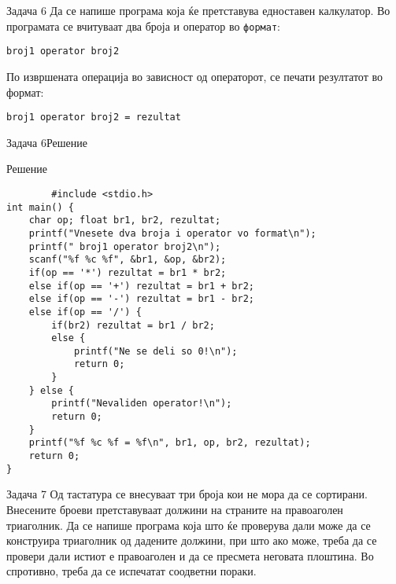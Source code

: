 \begin{frame}[fragile]{Задача 6}
Да се напише програма која ќе претставува едноставен калкулатор. Во програмата
се вчитуваат два броја и оператор во \texttt{формат}:
\begin{center}
\texttt{broj1 operator broj2}
\end{center}
По извршената операција во зависност од операторот, се печати резултатот во формат:
\begin{center}
\texttt{broj1 operator broj2 = rezultat}
\end{center}
\end{frame}

\begin{frame}[fragile]{Задача 6}{Решение}
	\begin{exampleblock}{Решение}
		\begin{lstlisting}
		#include <stdio.h>
int main() {
    char op; float br1, br2, rezultat;
    printf("Vnesete dva broja i operator vo format\n");
    printf(" broj1 operator broj2\n");
    scanf("%f %c %f", &br1, &op, &br2);
    if(op == '*') rezultat = br1 * br2;
    else if(op == '+') rezultat = br1 + br2;
    else if(op == '-') rezultat = br1 - br2;
    else if(op == '/') {
        if(br2) rezultat = br1 / br2;
        else {
            printf("Ne se deli so 0!\n");
            return 0;
        }
    } else {
        printf("Nevaliden operator!\n");
        return 0;
    }
    printf("%f %c %f = %f\n", br1, op, br2, rezultat);
    return 0;
}
		\end{lstlisting}
	\end{exampleblock}
\end{frame}


\begin{frame}[fragile]{Задача 7}
Од тастатура се внесуваат три броја кои не мора да се сортирани. Внесените броеви претставуваат должини на страните на правоаголен триаголник. Да се напише програма која што ќе проверува дали може да се конструира триаголник од дадените должини, при што ако може, треба да се провери дали истиот е правоаголен и да се пресмета неговата плоштина. Во спротивно, треба да се испечатат соодветни пораки.
\end{frame}


